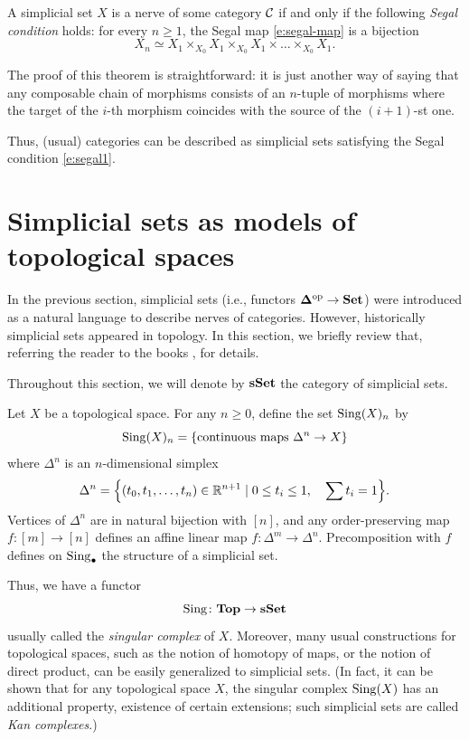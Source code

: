 \begin{theorem}\label{t:segal1}
  A simplicial set $X$ is a nerve of some category $\mathcal{C}$ if and only if the
  following \emph{Segal condition} holds: for every $n\ge
  1$, the Segal map \eqref{e:segal-map} is a bijection
  \begin{equation}\label{e:segal1}
    X_n \simeq X_1\times_{X_0} X_1\times_{X_0} X_1 \times\dots \times_{X_0} X_1.
  \end{equation}
\end{theorem}
The proof of this theorem is straightforward:
it is just another way of saying that any
composable chain of morphisms consists of an $n$-tuple of morphisms where the
target of the $i$-th morphism coincides with the source of the $(i+1)$-st one.


Thus, (usual) categories can be described as simplicial sets satisfying the Segal
condition \eqref{e:segal1}.

\section{Simplicial sets as models of topological spaces}\label{s:sset}

In the previous section, simplicial sets (i.e., functors $\mathbf{\Delta}^{\mathrm{op}}\to \mathbf{Set}$)
were introduced as a natural language to describe nerves of categories. However,
historically simplicial sets appeared in topology. In this section, we briefly
review that, referring the reader to the books \cite{may},
\cite{goerss-jardine} for details.

Throughout this section, we will denote by $\mathbf{sSet}$ the category of simplicial
sets.

\begin{example}\label{x:top-sset}
  Let $X$ be a topological space. For any $n\ge 0$, define the set
  $\operatorname{Sing}(X)_n$ by
  $$
    \operatorname{Sing}(X)_n= \{\text{continuous maps }\Delta^n\to X\}
  $$
  where $\Delta^n$ is an $n$-dimensional simplex
  \begin{equation}\label{e:simplex}
    \Delta^n=\Bigl\{
              (t_0, t_1, \dots, t_n)\in \mathbb{R}^{n+1}\; | \;
              0\le t_i \le 1, \quad \sum t_i=1
             \Bigr\}.
  \end{equation}
  Vertices of $\Delta^n$ are in natural bijection with $[n]$, and any
  order-preserving map $f\colon [m]\to [n]$ defines an affine linear
  map $f\colon \Delta^m \to \Delta^n$. Precomposition with $f$ defines on
  $\operatorname{Sing}_\bullet$ the structure of a simplicial set.
\end{example}
Thus, we have a functor
$$
  \operatorname{Sing}\colon \mathbf{Top} \to \mathbf{sSet}
$$
usually called the \emph{singular complex} of $X$.
Moreover, many usual constructions for topological spaces, such as the notion of
homotopy of maps, or the notion of direct product, can be easily generalized to
simplicial sets. (In fact, it can be shown that for any topological space $X$,
the singular complex $\operatorname{Sing}(X)$ has an additional property, existence of
certain extensions; such simplicial sets are called \emph{Kan complexes}.)


